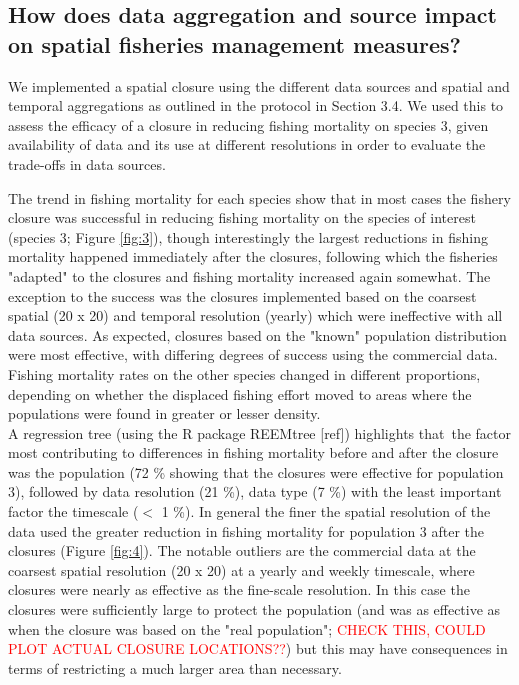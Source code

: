\documentclass[review]{elsarticle}
\begin{document}
\subsection{How does data aggregation and source impact on spatial fisheries
	management measures?}

We implemented a spatial closure using the different data sources and spatial
and temporal aggregations as outlined in the protocol in Section 3.4. We used
this to assess the efficacy of a closure in reducing fishing mortality on
species 3, given availability of data and its use at different resolutions in
order to evaluate the trade-offs in data sources. 

The trend in fishing mortality for each species show that in most cases the
fishery closure was successful in reducing fishing mortality on the species of
interest (species 3; Figure \ref{fig:3}), though interestingly the largest
reductions in fishing mortality happened immediately after the closures,
following which the fisheries "adapted" to the closures and fishing mortality
increased again somewhat. The exception to the success was the closures
implemented based on the coarsest spatial (20 x 20) and temporal resolution
(yearly) which were ineffective with all data sources. As expected, closures
based on the "known" population distribution were most effective, with
differing degrees of success using the commercial data. Fishing mortality rates
on the other species changed in different proportions, depending on whether the
displaced fishing effort moved to areas where the populations were found in
greater or lesser density. \\

A regression tree (using the R package REEMtree [ref]) highlights that the
factor most contributing to differences in fishing mortality before and after
the closure was the population (72 \% showing that the closures were effective
for population 3), followed by data resolution (21 \%), data type (7 \%) with
the least important factor the timescale ($<$ 1 \%). In general the finer the
spatial resolution of the data used the greater reduction in fishing mortality
for population 3 after the closures (Figure \ref{fig:4}). The notable outliers
are the commercial data at the coarsest spatial resolution (20 x 20) at a
yearly and weekly timescale, where closures were nearly as effective as the
fine-scale resolution. In this case the closures were sufficiently large to
protect the population (and was as effective as when the closure was based on
the "real population"; \textcolor{red}{CHECK THIS, COULD PLOT ACTUAL CLOSURE
	LOCATIONS??}) but this may have consequences in terms of restricting a
much larger area than necessary. \\
\end{document}
